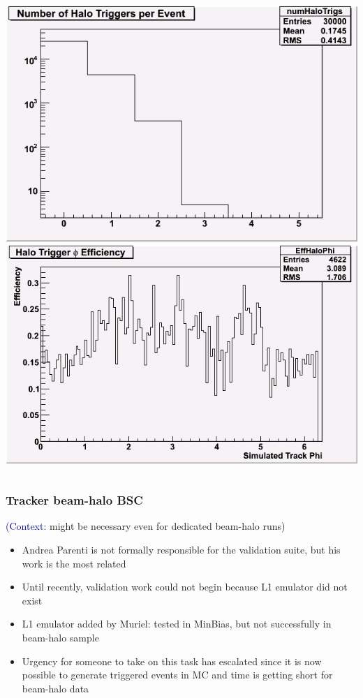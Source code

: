 \documentclass[compress]{beamer}
\begin{document}
\begin{frame}
\begin{columns}
\includegraphics[width=\linewidth]{NumHaloTrigs.png}
\includegraphics[width=\linewidth]{PhiEfficiency.png}
\end{columns}
\end{frame}

\begin{frame}
\frametitle{Tracker beam-halo BSC}
\small

\hspace{-0.83 cm} \textcolor{darkblue}{\Large (Context:} might be necessary even for dedicated beam-halo runs{\Large )}

\vfill
\begin{itemize}\setlength{\itemsep}{0.25 cm}
\item Andrea Parenti is not formally responsible for the validation suite, but his work is the most related

\item Until recently, validation work could not begin because L1 emulator did not exist

\item L1 emulator added by Muriel: tested in MinBias, but not successfully in beam-halo sample

\item Urgency for someone to take on this task has escalated since it
  is now possible to generate triggered events in MC and time is getting short for beam-halo data
\end{itemize}
\end{frame}
\end{document}

